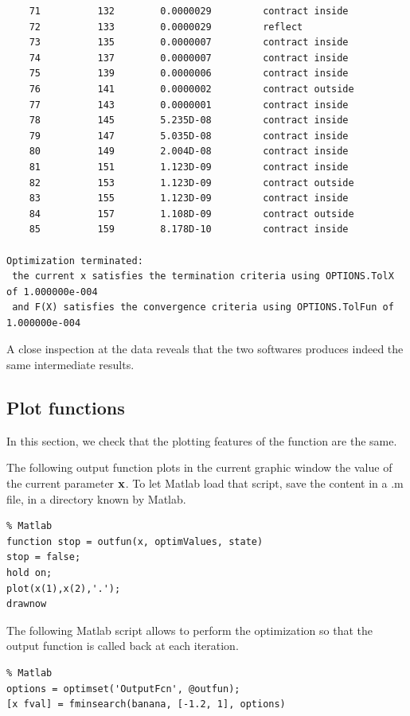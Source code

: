 \begin{lstlisting}
    71          132        0.0000029         contract inside     
    72          133        0.0000029         reflect             
    73          135        0.0000007         contract inside     
    74          137        0.0000007         contract inside     
    75          139        0.0000006         contract inside     
    76          141        0.0000002         contract outside    
    77          143        0.0000001         contract inside     
    78          145        5.235D-08         contract inside     
    79          147        5.035D-08         contract inside     
    80          149        2.004D-08         contract inside     
    81          151        1.123D-09         contract inside     
    82          153        1.123D-09         contract outside    
    83          155        1.123D-09         contract inside     
    84          157        1.108D-09         contract outside    
    85          159        8.178D-10         contract inside     

Optimization terminated:
 the current x satisfies the termination criteria using OPTIONS.TolX of 1.000000e-004
 and F(X) satisfies the convergence criteria using OPTIONS.TolFun of 1.000000e-004
\end{lstlisting}

A close inspection at the data reveals that the two softwares produces
indeed the same intermediate results. 

\subsection{Plot functions}

In this section, we check that the plotting features of the 
 function are the same.

The following output function plots in the current graphic 
window the value of the current parameter $\mathbf{x}$.
To let Matlab load that script, save the content in a 
.m file, in a directory known by Matlab.

\lstset{language=matlabscript}
\begin{lstlisting}
% Matlab
function stop = outfun(x, optimValues, state)
stop = false;
hold on;
plot(x(1),x(2),'.');
drawnow
\end{lstlisting}

The following Matlab script allows to perform the optimization
so that the output function is called back at each iteration.

\lstset{language=matlabscript}
\begin{lstlisting}
% Matlab
options = optimset('OutputFcn', @outfun);
[x fval] = fminsearch(banana, [-1.2, 1], options)
\end{lstlisting}

